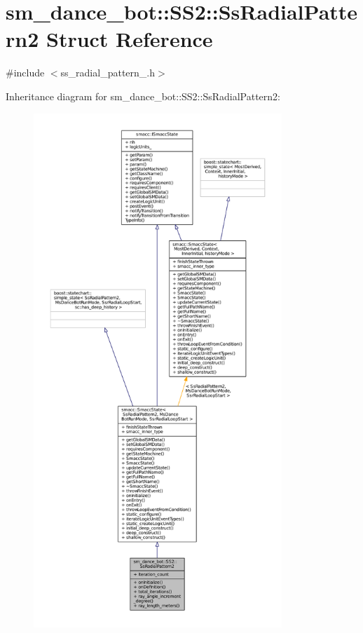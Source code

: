 \hypertarget{structsm__dance__bot_1_1SS2_1_1SsRadialPattern2}{}\section{sm\+\_\+dance\+\_\+bot\+:\+:S\+S2\+:\+:Ss\+Radial\+Pattern2 Struct Reference}
\label{structsm__dance__bot_1_1SS2_1_1SsRadialPattern2}


{\ttfamily \#include $<$ss\+\_\+radial\+\_\+pattern\+\_.\+h$>$}



Inheritance diagram for sm\+\_\+dance\+\_\+bot\+:\+:S\+S2\+:\+:Ss\+Radial\+Pattern2\+:
\nopagebreak
\begin{figure}[H]
\begin{center}
\leavevmode
\includegraphics[height=550pt]{structsm__dance__bot_1_1SS2_1_1SsRadialPattern2__inherit__graph}
\end{center}
\end{figure}



